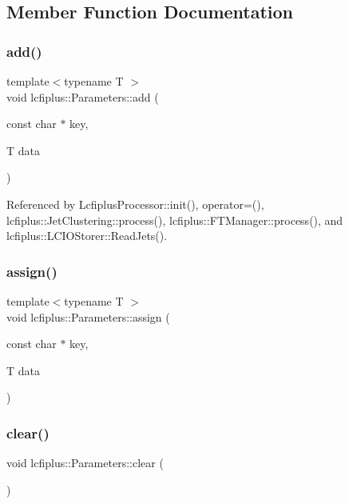 \subsection{Member Function Documentation}
\mbox{\label{classlcfiplus_1_1Parameters_a72360e493087ca775163442c63b5cab7}} 
\subsubsection{add()}
{\footnotesize\ttfamily template$<$typename T $>$ \\
void lcfiplus\+::\+Parameters\+::add (\begin{DoxyParamCaption}\item[{const char $\ast$}]{key,  }\item[{T}]{data }\end{DoxyParamCaption})\hspace{0.3cm}{\ttfamily [inline]}}



Referenced by Lcfiplus\+Processor\+::init(), operator=(), lcfiplus\+::\+Jet\+Clustering\+::process(), lcfiplus\+::\+F\+T\+Manager\+::process(), and lcfiplus\+::\+L\+C\+I\+O\+Storer\+::\+Read\+Jets().

\mbox{\label{classlcfiplus_1_1Parameters_a914dd51a8f56ef674b8becf1cfb6b0e5}} 
\subsubsection{assign()}
{\footnotesize\ttfamily template$<$typename T $>$ \\
void lcfiplus\+::\+Parameters\+::assign (\begin{DoxyParamCaption}\item[{const char $\ast$}]{key,  }\item[{T}]{data }\end{DoxyParamCaption})\hspace{0.3cm}{\ttfamily [inline]}}

\mbox{\label{classlcfiplus_1_1Parameters_abcb5934a6f3d284892b3c1fe6890776e}} 
\subsubsection{clear()}
{\footnotesize\ttfamily void lcfiplus\+::\+Parameters\+::clear (\begin{DoxyParamCaption}{ }\end{DoxyParamCaption})}



